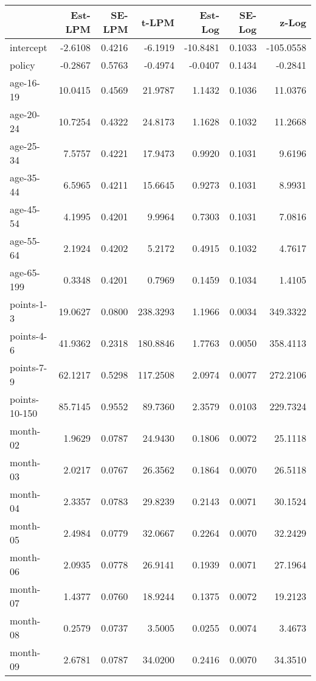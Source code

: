 \documentclass[10pt]{article}
\begin{document}
\begin{table}[ht]
\centering
\begin{tabular}{lrrrrrr}
  \hline
 & Est-LPM & SE-LPM & t-LPM & Est-Log & SE-Log & z-Log \\ 
  \hline
intercept & -2.6108 & 0.4216 & -6.1919 & -10.8481 & 0.1033 & -105.0558 \\ 
  policy & -0.2867 & 0.5763 & -0.4974 & -0.0407 & 0.1434 & -0.2841 \\ 
  age-16-19 & 10.0415 & 0.4569 & 21.9787 & 1.1432 & 0.1036 & 11.0376 \\ 
  age-20-24 & 10.7254 & 0.4322 & 24.8173 & 1.1628 & 0.1032 & 11.2668 \\ 
  age-25-34 & 7.5757 & 0.4221 & 17.9473 & 0.9920 & 0.1031 & 9.6196 \\ 
  age-35-44 & 6.5965 & 0.4211 & 15.6645 & 0.9273 & 0.1031 & 8.9931 \\ 
  age-45-54 & 4.1995 & 0.4201 & 9.9964 & 0.7303 & 0.1031 & 7.0816 \\ 
  age-55-64 & 2.1924 & 0.4202 & 5.2172 & 0.4915 & 0.1032 & 4.7617 \\ 
  age-65-199 & 0.3348 & 0.4201 & 0.7969 & 0.1459 & 0.1034 & 1.4105 \\ 
  points-1-3 & 19.0627 & 0.0800 & 238.3293 & 1.1966 & 0.0034 & 349.3322 \\ 
  points-4-6 & 41.9362 & 0.2318 & 180.8846 & 1.7763 & 0.0050 & 358.4113 \\ 
  points-7-9 & 62.1217 & 0.5298 & 117.2508 & 2.0974 & 0.0077 & 272.2106 \\ 
  points-10-150 & 85.7145 & 0.9552 & 89.7360 & 2.3579 & 0.0103 & 229.7324 \\ 
  month-02 & 1.9629 & 0.0787 & 24.9430 & 0.1806 & 0.0072 & 25.1118 \\ 
  month-03 & 2.0217 & 0.0767 & 26.3562 & 0.1864 & 0.0070 & 26.5118 \\ 
  month-04 & 2.3357 & 0.0783 & 29.8239 & 0.2143 & 0.0071 & 30.1524 \\ 
  month-05 & 2.4984 & 0.0779 & 32.0667 & 0.2264 & 0.0070 & 32.2429 \\ 
  month-06 & 2.0935 & 0.0778 & 26.9141 & 0.1939 & 0.0071 & 27.1964 \\ 
  month-07 & 1.4377 & 0.0760 & 18.9244 & 0.1375 & 0.0072 & 19.2123 \\ 
  month-08 & 0.2579 & 0.0737 & 3.5005 & 0.0255 & 0.0074 & 3.4673 \\ 
  month-09 & 2.6781 & 0.0787 & 34.0200 & 0.2416 & 0.0070 & 34.3510 \\ 

\end{tabular}
\end{table}
\end{document}
